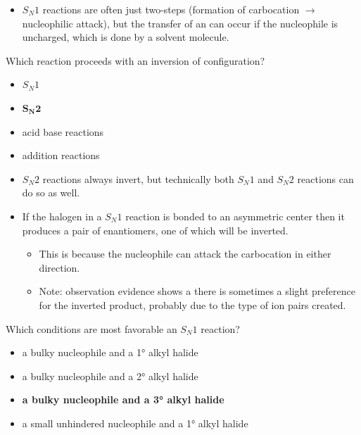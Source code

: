 \documentclass[12pt,a4paper]{article}
\begin{document}
\begin{enumerate}
\begin{itemize}
\begin{itemize}
                \end{itemize}
            \item \(S_N1\) reactions are often just two-steps (formation of carbocation $\rightarrow$ nucleophilic attack), but the transfer of an  can occur if the nucleophile is uncharged, which is done by a solvent molecule. 
        \end{itemize}
    {\color{G-Moon}\item Which reaction proceeds with an inversion of configuration?
    \begin{itemize}
        \item \(S_N1\)
        \item {\color{o-Sun}\textbf{\(\bm{S_N2}\)}}
        \item acid base reactions
        \item addition reactions
    \end{itemize}}
        \begin{itemize}
            \item \(S_N2\) reactions always invert, but technically both \(S_N1\) and \(S_N2\) reactions can do so as well.
            \item If the halogen in a \(S_N1\) reaction is bonded to an asymmetric center then it produces a pair of enantiomers, one of which will be inverted.
                \begin{itemize}
                    \item This is because the nucleophile can attack the carbocation in either direction. 
                    \item Note: observation evidence shows a there is sometimes a slight preference for the inverted product, probably due to the type of ion pairs created.
                \end{itemize}
        \end{itemize}
    {\color{G-Moon}\item Which conditions are most favorable an \(S_N1\) reaction?
    \begin{itemize}
        \item a bulky nucleophile and a \ang{1} alkyl halide
        \item a bulky nucleophile and a \ang{2} alkyl halide
        \item {\color{o-Sun}\textbf{a bulky nucleophile and a \ang{3} alkyl halide}}
        \item a small unhindered nucleophile and a \ang{1} alkyl halide
    \end{itemize}}

\end{enumerate}
\end{document}
